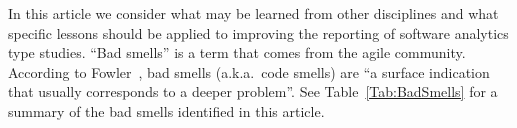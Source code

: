\documentclass[10pt]{elsarticle}
\begin{document}

In this article we consider what may be learned from other disciplines and what specific lessons should be applied to improving the reporting of software analytics type studies.  ``Bad smells'' is a term that comes from the agile community. According to Fowler~\cite{beck1999bad}, bad smells (a.k.a.\ code smells) are ``a surface indication that usually corresponds to a deeper problem''.  See Table~\ref{Tab:BadSmells} for a summary of the bad smells identified in this article.
\end{document}
